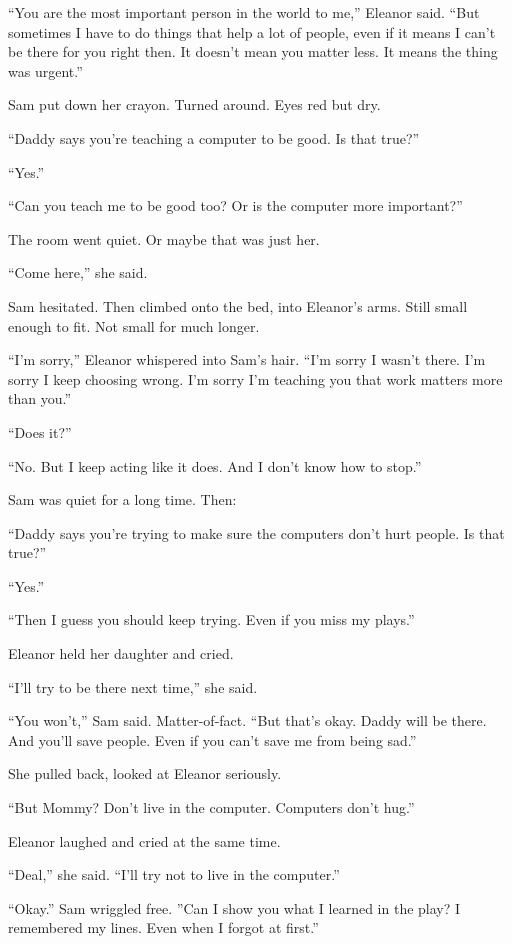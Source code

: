 ``You are the most important person in the world to me,'' Eleanor said. ``But sometimes I have to do things that help a lot of people, even if it means I can't be there for you right then. It doesn't mean you matter less. It means the thing was urgent.''

Sam put down her crayon. Turned around. Eyes red but dry.

``Daddy says you're teaching a computer to be good. Is that true?''

``Yes.''

``Can you teach me to be good too? Or is the computer more important?''

The room went quiet. Or maybe that was just her.

``Come here,'' she said.

Sam hesitated. Then climbed onto the bed, into Eleanor's arms. Still small enough to fit. Not small for much longer.

``I'm sorry,'' Eleanor whispered into Sam's hair. ``I'm sorry I wasn't there. I'm sorry I keep choosing wrong. I'm sorry I'm teaching you that work matters more than you.''

``Does it?''

``No. But I keep acting like it does. And I don't know how to stop.''

Sam was quiet for a long time. Then:

``Daddy says you're trying to make sure the computers don't hurt people. Is that true?''

``Yes.''

``Then I guess you should keep trying. Even if you miss my plays.''

Eleanor held her daughter and cried.

``I'll try to be there next time,'' she said.

``You won't,'' Sam said. Matter-of-fact. ``But that's okay. Daddy will be there. And you'll save people. Even if you can't save me from being sad.''

She pulled back, looked at Eleanor seriously.

``But Mommy? Don't live in the computer. Computers don't hug.''

Eleanor laughed and cried at the same time.

``Deal,'' she said. ``I'll try not to live in the computer.''

``Okay.'' Sam wriggled free. ''Can I show you what I learned in the play? I remembered my lines. Even when I forgot at first.''

